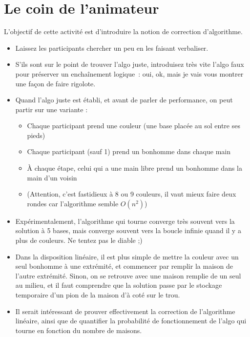 

\section*{Le coin de l'animateur}

L'objectif de cette activité est d'introduire la notion de correction d'algorithme.

\begin{itemize}
  \item Laissez les participants chercher un peu en les faisant verbaliser.
  \item S'ils sont sur le point de trouver l'algo juste, introduisez très vite l'algo faux pour préserver un enchaînement logique~: \og oui, ok, mais je vais vous montrer une façon de faire rigolote. \fg
  \item Quand l'algo juste est établi, et avant de parler de performance, on peut partir sur une variante :
    \begin{itemize}
    \item Chaque participant prend une couleur (une base placée au sol entre ses pieds)
    \item Chaque participant (sauf 1) prend un bonhomme dans chaque main
    \item À chaque étape, celui qui a une main libre prend un bonhomme dans la main d'un voisin
    \item (Attention, c'est fastidieux à 8 ou 9 couleurs, il vaut mieux faire deux rondes car l'algorithme semble $O(n^2)$)
    \end{itemize}
  \item Expérimentalement, l'algorithme qui tourne converge très souvent vers la solution à 5 bases, mais converge souvent vers la boucle infinie quand il y a plus de couleurs. Ne tentez pas le diable ;)
  \item Dans la disposition linéaire, il est plus simple de mettre la couleur avec un seul bonhomme à une extrémité, et commencer par remplir la maison de l'autre extrémité. Sinon, on se retrouve avec une maison remplie de un seul au milieu, et il faut comprendre que la solution passe par le stockage temporaire d'un pion de la maison d'à coté sur le trou.
  \item Il serait intéressant de prouver effectivement la correction de l'algorithme linéaire, ainsi que de quantifier la probabilité de fonctionnement de l'algo qui tourne en fonction du nombre de maisons.
\end{itemize}


